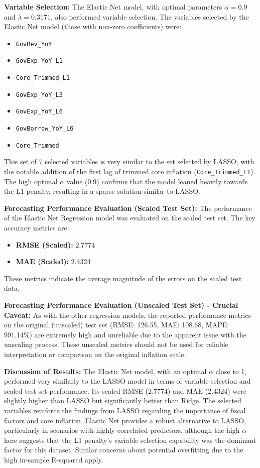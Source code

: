 \documentclass[12pt,a4paper]{article}
\begin{document}
\textbf{Variable Selection:}
The Elastic Net model, with optimal parameters $\alpha = 0.9$ and $\lambda = 0.3171$, also performed variable selection. The variables selected by the Elastic Net model (those with non-zero coefficients) were:
\begin{itemize}
    \item \texttt{GovRev\_YoY}
    \item \texttt{GovExp\_YoY\_L1}
    \item \texttt{Core\_Trimmed\_L1}
    \item \texttt{GovExp\_YoY\_L3}
    \item \texttt{GovExp\_YoY\_L6}
    \item \texttt{GovBorrow\_YoY\_L6}
    \item \texttt{Core\_Trimmed}
\end{itemize}
This set of 7 selected variables is very similar to the set selected by LASSO, with the notable addition of the first lag of trimmed core inflation (\texttt{Core\_Trimmed\_L1}). The high optimal $\alpha$ value (0.9) confirms that the model leaned heavily towards the L1 penalty, resulting in a sparse solution similar to LASSO.

\textbf{Forecasting Performance Evaluation (Scaled Test Set):}
The performance of the Elastic Net Regression model was evaluated on the scaled test set. The key accuracy metrics are:
\begin{itemize}
    \item \textbf{RMSE (Scaled):} 2.7774
    \item \textbf{MAE (Scaled):} 2.4324
\end{itemize}
These metrics indicate the average magnitude of the errors on the scaled test data.

\textbf{Forecasting Performance Evaluation (Unscaled Test Set) - Crucial Caveat:}
As with the other regression models, the reported performance metrics on the original (unscaled) test set (RMSE: 126.55, MAE: 108.68, MAPE: 991.14\%) are extremely high and unreliable due to the apparent issue with the unscaling process. These unscaled metrics should not be used for reliable interpretation or comparison on the original inflation scale.

\textbf{Discussion of Results:}
The Elastic Net model, with an optimal $\alpha$ close to 1, performed very similarly to the LASSO model in terms of variable selection and scaled test set performance. Its scaled RMSE (2.7774) and MAE (2.4324) were slightly higher than LASSO but significantly better than Ridge. The selected variables reinforce the findings from LASSO regarding the importance of fiscal factors and core inflation. Elastic Net provides a robust alternative to LASSO, particularly in scenarios with highly correlated predictors, although the high $\alpha$ here suggests that the L1 penalty's variable selection capability was the dominant factor for this dataset. Similar concerns about potential overfitting due to the high in-sample R-squared apply.
\end{document}
